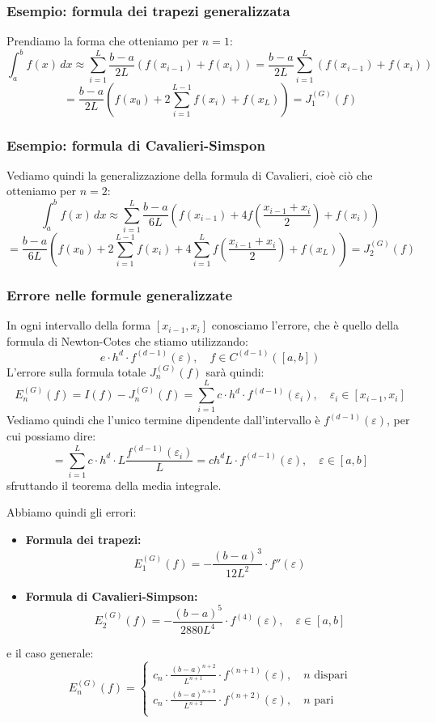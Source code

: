 \documentclass[a4paper,11pt]{article}
\begin{document}
\subsubsection{Esempio: formula dei trapezi generalizzata}
Prendiamo la forma che otteniamo per $n = 1$:
$$
\int_a^b f(x) \, dx \approx \sum_{i = 1}^L \frac{b - a}{2L} \left( f(x_{i - 1}) + f(x_i) \right) = \frac{b - a}{2L} \sum_{i = 1}^L \left( f(x_{i - 1}) + f(x_i) \right)
$$
$$
= \frac{b - a}{2L} \left( f(x_0) + 2 \sum_{i = 1}^{L - 1} f(x_i) + f(x_L) \right) = J_1^{(G)} (f)
$$

\subsubsection{Esempio: formula di Cavalieri-Simspon}
Vediamo quindi la generalizzazione della formula di Cavalieri, cioè ciò che otteniamo per $n = 2$:
$$
\int_a^b f(x) \, dx \approx \sum_{i = 1}^L \frac{b - a}{6L} \left( f(x_{i - 1}) + 4 f \left( \frac{x_{i - 1} + x_i}{2} \right) + f(x_i) \right)
$$
$$
= \frac{b - a}{6L} \left( f(x_0) + 2 \sum_{i = 1}^{L-1} f(x_i) + 4 \sum_{i = 1}^{L} f\left( \frac{x_{i - 1} + x_i}{2} \right) + f(x_L) \right) = J_2^{(G)} (f)
$$

\subsubsection{Errore nelle formule generalizzate}
In ogni intervallo della forma $[x_{i - 1}, x_i]$ conosciamo l'errore, che è quello della formula di Newton-Cotes che stiamo utilizzando:
$$
e \cdot h^d \cdot f^{(d - 1)} (\varepsilon), \quad f \in C^{(d - 1)} ([a, b])
$$
L'errore sulla formula totale $J_n^{(G)}(f)$ sarà quindi:
$$
E_n^{(G)} (f) = I(f) - J_n^{(G)} (f) = \sum_{i = 1}^L c \cdot h^d \cdot f^{(d - 1)}(\varepsilon_i), \quad \varepsilon_i \in [x_{i - 1}, x_i]
$$
Vediamo quindi che l'unico termine dipendente dall'intervallo è $f^{(d - 1)} (\varepsilon)$, per cui possiamo dire:
$$
= \sum_{i = 1}^L c \cdot h^d \cdot L \frac{f^{(d - 1)}(\varepsilon_i)}{L} = c h^dL \cdot f^{(d - 1)} (\varepsilon), \quad \varepsilon \in [a, b]
$$
sfruttando il teorema della media integrale.

Abbiamo quindi gli errori:
\begin{itemize}
	\item \textbf{Formula dei trapezi:}
		$$
		E_1^{(G)}(f) = -\frac{(b - a)^3}{12L^2} \cdot f''(\varepsilon)
		$$
	\item \textbf{Formula di Cavalieri-Simpson:}
		$$
		E_2^{(G)}(f) = -\frac{(b - a)^5}{2880L^4} \cdot f^{(4)} (\varepsilon), \quad \varepsilon \in [a, b]
		$$
\end{itemize}
e il caso generale:
$$
E_n^{(G)} (f) =
\begin{cases}
	c_n \cdot \frac{(b - a)^{n + 2}}{L^{n + 1}} \cdot f^{(n + 1)} (\varepsilon), \quad n \text{ dispari} \\
	c_n \cdot \frac{(b - a)^{n + 3}}{L^{n + 2}} \cdot f^{(n + 2)} (\varepsilon), \quad n \text{ pari} \\
\end{cases}
$$
\end{document}
